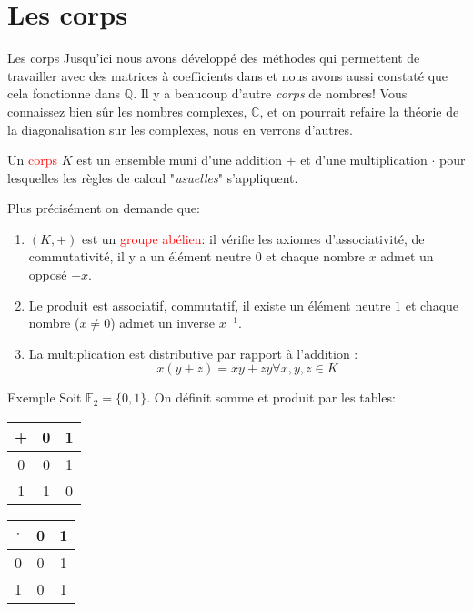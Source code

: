 \chapter{Les corps}
\begin{parag}{Les corps}
    Jusqu'ici nous avons développé des méthodes qui permettent de travailler avec des matrices à coefficients dans \R et nous avons aussi constaté que cela fonctionne dans $\mathbb{Q}$. Il y a beaucoup d'autre \textit{corps} de nombres! Vous connaissez bien sûr les nombres complexes, $\mathbb{C}$, et on pourrait refaire la théorie de la diagonalisation sur les complexes, nous en verrons d'autres.
    \begin{definition}
        Un \textcolor{red}{corps} $K$ est un ensemble muni d'une addition $+$ et d'une multiplication $\cdot$ pour lesquelles les règles de calcul "\textit{usuelles}" s'appliquent.
    \end{definition}

    Plus précisément on demande que:
    \begin{enumerate}
        \item $(K, +)$ est un \textcolor{red}{groupe abélien}: il vérifie les axiomes d'associativité, de commutativité, il y a un élément neutre $0$ et chaque nombre $x$ admet un opposé $-x$.
        \item Le produit est associatif, commutatif, il existe un élément neutre $1$ et chaque nombre ($x \neq 0$) admet un inverse $x^{-1}$.
        \item La multiplication est distributive par rapport à l'addition : 
        \[x(y + z) = xy + zy \forall x, y, z \in K\]
    \end{enumerate}
    \begin{subparag}{Exemple}
        Soit $\mathbb{F}_2 = \{0, 1\}$. On définit somme et produit par les tables:
        \begin{center}
            
        
        \begin{tabular}{|c||c|c|}
        \hline
           +  & 0 & 1 \\
           \hline
           \hline
            0 & 0 & 1\\
            \hline
            1 & 1 & 0\\
            \hline
        \end{tabular}

        
        \begin{tabular}{|c||c|c|}
        \hline
           $\cdot$  & 0 & 1 \\
           \hline
           \hline
            0 & 0 & 1\\
            \hline
            1 & 0 & 1\\
            \hline
        \end{tabular}



\end{center}
\end{subparag}
\end{parag}
